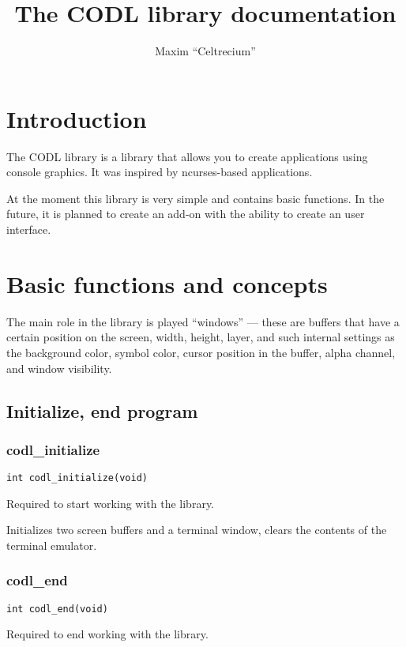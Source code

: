 \documentclass{article}
\author{Maxim ``Celtrecium''}
\title{The CODL library documentation}
\newcommand{\fstep}{\vspace{3mm}\noindent}
\begin{document}
{\vspace{10cm}\bf\Huge\maketitle}

\newpage

\tableofcontents

\newpage

\section{Introduction}

The CODL library is a library that allows you to create applications using
console graphics. It was inspired by ncurses-based applications.

At the moment this library is very simple and contains basic functions. In the
future, it is planned to create an add-on with the ability to create an user
interface.

\section{Basic functions and concepts}
The main role in the library is played ``windows'' --- these are
buffers that have a certain position on the screen, width, height, layer,
and such internal settings as the background color, symbol color, cursor
position in the buffer, alpha channel, and window visibility.

\subsection{Initialize, end program}

\subsubsection{codl\_initialize}
{\tt int codl\_initialize(void)}

\fstep{} Required to start working with the library.

\noindent\smallskip Initializes two screen buffers and a terminal window, clears the contents
of the terminal emulator.

\subsubsection{codl\_end}
{\tt int codl\_end(void)}

\fstep{} Required to end working with the library.
\end{document}
